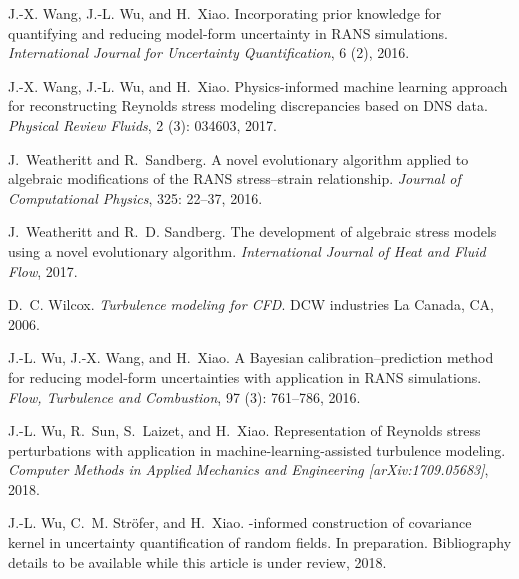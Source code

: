 \documentclass[a4paper]{ar-1col}
\begin{document}
\begin{thebibliography}{82}
J.-X. Wang, J.-L. Wu, and H.~Xiao.
\newblock Incorporating prior knowledge for quantifying and reducing model-form
  uncertainty in {RANS} simulations.
\newblock \emph{International Journal for Uncertainty Quantification},
  6 (2), 2016{}.

J.-X. Wang, J.-L. Wu, and H.~Xiao.
\newblock Physics-informed machine learning approach for reconstructing
  {Reynolds} stress modeling discrepancies based on {DNS} data.
\newblock \emph{Physical Review Fluids}, 2 (3): 034603, 2017.

J.~Weatheritt and R.~Sandberg.
\newblock A novel evolutionary algorithm applied to algebraic modifications of
  the {RANS} stress--strain relationship.
\newblock \emph{Journal of Computational Physics}, 325: 22--37, 2016.

J.~Weatheritt and R.~D. Sandberg.
\newblock The development of algebraic stress models using a novel evolutionary
  algorithm.
\newblock \emph{International Journal of Heat and Fluid Flow}, 2017.

D.~C. Wilcox.
\newblock \emph{Turbulence modeling for CFD}.
\newblock DCW industries La Canada, CA, 2006.

J.-L. Wu, J.-X. Wang, and H.~Xiao.
\newblock A {Bayesian} calibration--prediction method for reducing model-form
  uncertainties with application in {RANS} simulations.
\newblock \emph{Flow, Turbulence and Combustion}, 97 (3):
  761--786, 2016.

J.-L. Wu, R.~Sun, S.~Laizet, and H.~Xiao.
\newblock Representation of {Reynolds} stress perturbations with application in
  machine-learning-assisted turbulence modeling.
\newblock \emph{Computer Methods in Applied Mechanics and Engineering [arXiv:1709.05683]}, 2018.

J.-L. Wu, C.~M. Str{\"o}fer, and H.~Xiao.
-informed construction of covariance kernel in uncertainty
  quantification of random fields.
\newblock In preparation. Bibliography details to be available while this
  article is under review, 2018{}.


\end{thebibliography}
\end{document}
